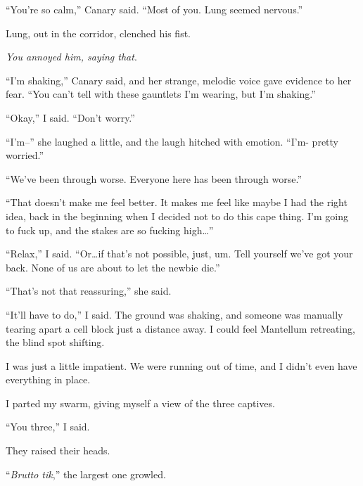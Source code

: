 ``You're so calm,'' Canary said.  ``Most of you.  Lung seemed nervous.''



Lung, out in the corridor, clenched his fist.



\emph{You annoyed him, saying that}.



``I'm shaking,'' Canary said, and her strange, melodic voice gave evidence to her fear.  ``You can't tell with these gauntlets I'm wearing, but I'm shaking.''



``Okay,'' I said.  ``Don't worry.''



``I'm--'' she laughed a little, and the laugh hitched with emotion.  ``I'm- pretty worried.''



``We've been through worse.  Everyone here has been through worse.''



``That doesn't make me feel better.  It makes me feel like maybe I had the right idea, back in the beginning when I decided not to do this cape thing.  I'm going to fuck up, and the stakes are so fucking high\ldots''



``Relax,'' I said.  ``Or\ldots if that's not possible, just, um.  Tell yourself we've got your back.  None of us are about to let the newbie die.''



``That's not that reassuring,'' she said.



``It'll have to do,'' I said.  The ground was shaking, and someone was manually tearing apart a cell block just a distance away.  I could feel Mantellum retreating, the blind spot shifting.



I was just a little impatient.  We were running out of time, and I didn't even have everything in place.



I parted my swarm, giving myself a view of the three captives.



``You three,'' I said.



They raised their heads.



``\emph{Brutto tik},'' the largest one growled.



